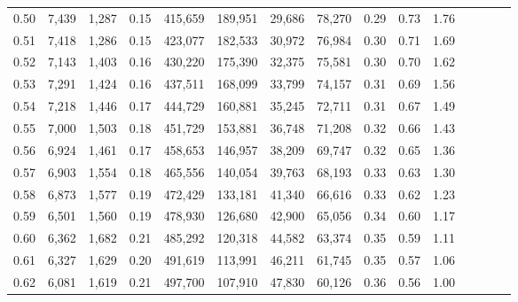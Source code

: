 \begin{tabular}{rrrcrrrrrrrrrrr}
0.50 &  7,439 &  1,287 &                                       0.15 &  415,659 &  189,951 &   29,686 &   78,270 &  0.29 &  0.73 &                         1.76 \\
0.51 &  7,418 &  1,286 &                                       0.15 &  423,077 &  182,533 &   30,972 &   76,984 &  0.30 &  0.71 &                         1.69 \\
0.52 &  7,143 &  1,403 &                                       0.16 &  430,220 &  175,390 &   32,375 &   75,581 &  0.30 &  0.70 &                         1.62 \\
0.53 &  7,291 &  1,424 &                                       0.16 &  437,511 &  168,099 &   33,799 &   74,157 &  0.31 &  0.69 &                         1.56 \\
0.54 &  7,218 &  1,446 &                                       0.17 &  444,729 &  160,881 &   35,245 &   72,711 &  0.31 &  0.67 &                         1.49 \\
0.55 &  7,000 &  1,503 &                                       0.18 &  451,729 &  153,881 &   36,748 &   71,208 &  0.32 &  0.66 &                         1.43 \\
0.56 &  6,924 &  1,461 &                                       0.17 &  458,653 &  146,957 &   38,209 &   69,747 &  0.32 &  0.65 &                         1.36 \\
0.57 &  6,903 &  1,554 &                                       0.18 &  465,556 &  140,054 &   39,763 &   68,193 &  0.33 &  0.63 &                         1.30 \\
0.58 &  6,873 &  1,577 &                                       0.19 &  472,429 &  133,181 &   41,340 &   66,616 &  0.33 &  0.62 &                         1.23 \\
0.59 &  6,501 &  1,560 &                                       0.19 &  478,930 &  126,680 &   42,900 &   65,056 &  0.34 &  0.60 &                         1.17 \\
0.60 &  6,362 &  1,682 &                                       0.21 &  485,292 &  120,318 &   44,582 &   63,374 &  0.35 &  0.59 &                         1.11 \\
0.61 &  6,327 &  1,629 &                                       0.20 &  491,619 &  113,991 &   46,211 &   61,745 &  0.35 &  0.57 &                         1.06 \\
0.62 &  6,081 &  1,619 &                                       0.21 &  497,700 &  107,910 &   47,830 &   60,126 &  0.36 &  0.56 &                         1.00 \\

\end{tabular}
